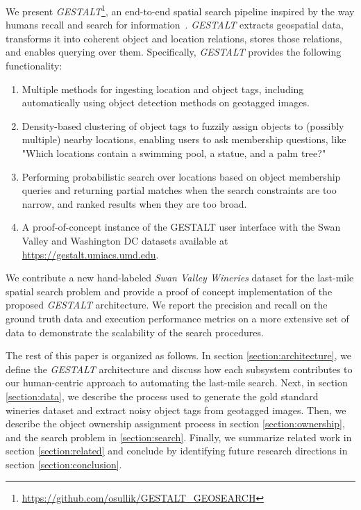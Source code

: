 We present \emph{GESTALT}\footnote{\url{https://github.com/osullik/GESTALT_GEOSEARCH}}, an end-to-end spatial search pipeline inspired by the way humans recall and search for information~\cite{Helbing2020, Oliveira2016, Weisberg2016}.
\emph{GESTALT} extracts geospatial data, transforms it into coherent object and location relations, stores those relations, and enables querying over them. 
Specifically, \emph{GESTALT} provides the following functionality:
\begin{enumerate}
    \item Multiple methods for ingesting location and object tags, including automatically using object detection methods on geotagged images.
    \item Density-based clustering of object tags to fuzzily assign objects to (possibly multiple) nearby locations, enabling users to ask membership questions, like "Which locations contain a swimming pool, a statue, and a palm tree?"
    \item Performing probabilistic search over locations based on object membership queries and returning partial matches when the search constraints are too narrow, and ranked results when they are too broad.
    \item A proof-of-concept instance of the GESTALT user interface with the Swan Valley and Washington DC datasets available at \url{https://gestalt.umiacs.umd.edu}.
\end{enumerate}

We contribute a new hand-labeled \textit{Swan Valley Wineries} dataset for the last-mile spatial search problem and provide a proof of concept implementation of the proposed \emph{GESTALT} architecture. We report the precision and recall on the ground truth data and execution performance metrics on a more extensive set of data to demonstrate the scalability of the search procedures.

The rest of this paper is organized as follows. In section \ref{section:architecture}, we define the \emph{GESTALT} architecture and discuss how each subsystem contributes to our human-centric approach to automating the last-mile search. 
Next, in section \ref{section:data}, we describe the process used to generate the gold standard wineries dataset and extract noisy object tags from geotagged images. Then, we describe the object ownership assignment process in section \ref{section:ownership}, and the search problem in \ref{section:search}. 
Finally, we summarize related work in section \ref{section:related} and conclude by identifying future research directions in section \ref{section:conclusion}.

